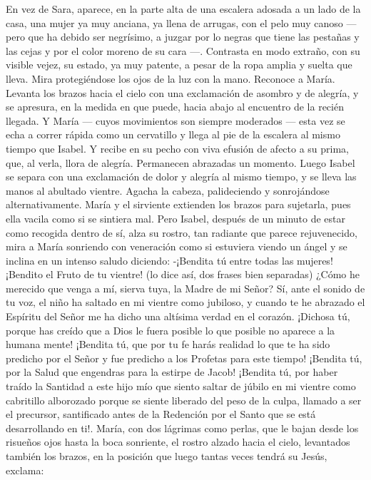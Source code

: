 \documentclass[12pt]{book} %
\begin{document}
En vez de Sara, aparece, en la parte alta de una escalera adosada a un lado de la casa, una mujer ya muy anciana, ya 
llena de arrugas, con el pelo muy canoso — pero que ha debido ser negrísimo, a juzgar por lo negras que tiene las pestañas y las cejas y por el color moreno de su cara —. Contrasta en modo extraño, con su visible vejez, su estado, ya muy patente, a pesar de la ropa amplia y suelta que lleva. Mira protegiéndose los ojos de la luz con la mano. Reconoce a María. Levanta los brazos hacia el cielo con una exclamación de asombro y de alegría, y se apresura, en la medida en que puede, hacia abajo al encuentro de la recién llegada. Y María — cuyos movimientos son siempre moderados — esta vez se echa a correr rápida como un cervatillo y llega al pie de la escalera al mismo tiempo que Isabel. Y recibe en su pecho con viva efusión de afecto a su prima, que, al verla, llora de alegría. 
Permanecen abrazadas un momento. Luego Isabel se separa con una exclamación de dolor y alegría al mismo tiempo, y se lleva las manos al abultado vientre. Agacha la cabeza, palideciendo y sonrojándose alternativamente. María y el sirviente extienden los brazos para sujetarla, pues ella vacila como si se sintiera mal. 
Pero Isabel, después de un minuto de estar como recogida dentro de sí, alza su rostro, tan radiante que parece rejuvenecido, mira a María sonriendo con veneración como si estuviera viendo un ángel y se inclina en un intenso saludo diciendo: 
-¡Bendita tú entre todas las mujeres! ¡Bendito el Fruto de tu vientre! (lo dice así, dos frases bien separadas) ¿Cómo he 
merecido que venga a mí, sierva tuya, la Madre de mi Señor? Sí, ante el sonido de tu voz, el niño ha saltado en mi vientre como jubiloso, y cuando te he abrazado el Espíritu del Señor me ha dicho una altísima verdad en el corazón. ¡Dichosa tú, porque has creído que a Dios le fuera posible lo que posible no aparece a la humana mente! ¡Bendita tú, que por tu fe harás realidad lo que te ha sido predicho por el Señor y fue predicho a los Profetas para este tiempo! ¡Bendita tú, por la Salud que engendras para la estirpe de Jacob! ¡Bendita tú, por haber traído la Santidad a este hijo mío que siento saltar de júbilo en mi vientre como cabritillo alborozado porque se siente liberado del peso de la culpa, llamado a ser el precursor, santificado antes de la Redención por el Santo que se está desarrollando en ti!. 
María, con dos lágrimas como perlas, que le bajan desde los risueños ojos hasta la boca sonriente, el rostro alzado hacia 
el cielo, levantados también los brazos, en la posición que luego tantas veces tendrá su Jesús, exclama: 
\end{document}

